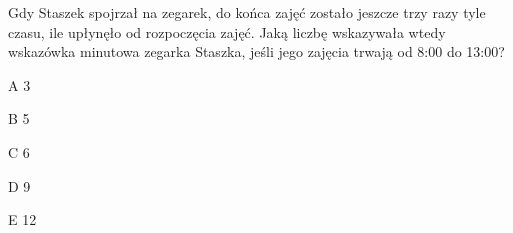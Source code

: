 \begin{tresc}
Gdy Staszek spojrzał na zegarek, do końca zajęć zostało jeszcze trzy razy tyle czasu, ile upłynęło od rozpoczęcia zajęć. Jaką liczbę wskazywała wtedy wskazówka minutowa zegarka Staszka, jeśli jego zajęcia trwają od 8:00 do 13:00?
\end{tresc}
\begin{wariant}{A} 3 \end{wariant}
\begin{wariant}{B} 5 \end{wariant}
\begin{wariant}{C} 6 \end{wariant}
\begin{wariant}{D} 9 \end{wariant}
\begin{wariant}{E} 12 \end{wariant}
